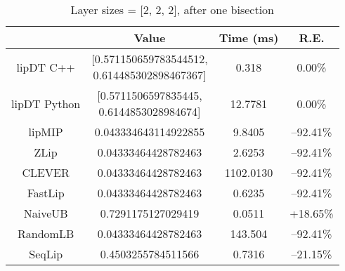 \documentclass[11pt]{article}
\begin{document}
\begin{table}[H]
\centering
\caption{Layer sizes = [2, 2, 2], after one bisection}
\begin{tabular}{|c|c|c|c|}
\hline
                & Value                              & Time (ms)      & R.E. \\ \hline
lipDT C++ &  \makecell*[c]{[0.571150659783544512,\\ 0.614485302898467367]} & 0.318 & 0.00\%    \\ \hline
lipDT Python &  \makecell*[c]{[0.5711506597835445,\\ 0.6144853028984674]} & 12.7781 & 0.00\%    \\ \hline
lipMIP          & 0.043334643114922855               & 9.8405   & --92.41\% \\ \hline
ZLip            & 0.04333464428782463                & 2.6253     & --92.41\%\\ \hline
CLEVER          & 0.04333464428782463				 & 1102.0130 & --92.41\%\\ \hline
FastLip         & 0.04333464428782463				 & 0.6235    & --92.41\% \\ \hline
NaiveUB         & 0.7291175127029419				 & 0.0511    & +18.65\% \\ \hline
RandomLB        & 0.04333464428782463				 & 143.504  & --92.41\% \\ \hline
SeqLip          & 0.4503255784511566                                                                                             & 0.7316 & --21.15\%  \\ \hline
\end{tabular}
\label{table:random2}
\end{table}
\end{document}
